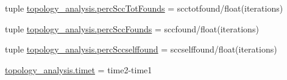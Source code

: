 \begin{DoxyCompactItemize}
\item 
tuple \hyperlink{a00157_aee49954a6b9abb7c4bd677c17ed4013b}{topology\-\_\-analysis.\-perc\-Scc\-Tot\-Founds} = scctotfound/float(iterations)
\item 
tuple \hyperlink{a00157_a14f23c89de77042b80e78e1d9ab7b754}{topology\-\_\-analysis.\-perc\-Scc\-Founds} = sccfound/float(iterations)
\item 
tuple \hyperlink{a00157_a8bf55c62b8e7385526396a9003e343bb}{topology\-\_\-analysis.\-perc\-Sccselffound} = sccselffound/float(iterations)
\item 
\hyperlink{a00157_a5b12bbbc66679be171ab082dbaeba90b}{topology\-\_\-analysis.\-timet} = time2-\/time1
\end{DoxyCompactItemize}
